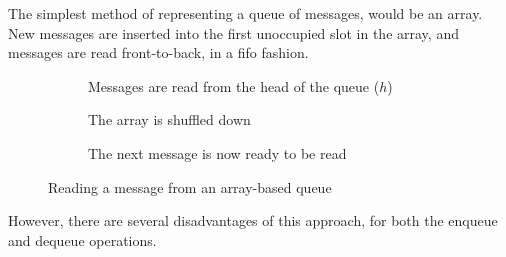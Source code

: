 The simplest method of representing a queue of messages, would be an array. New
messages are inserted into the first unoccupied slot in the array, and messages
are read front-to-back, in a \gls{fifo} fashion.

\begin{figure}[H]
  \centering
  \begin{subfigure}[b]{\textwidth}
    \centering
    
    \caption{Messages are read from the head of the queue ($h$)}
    \label{fig:tikz:queueArrayInitial}
  \end{subfigure}

  \begin{subfigure}[b]{\textwidth}
    \centering
    
    \caption{The array is shuffled down}
    \label{fig:tikz:queueArrayHeadRead}
  \end{subfigure}

  \begin{subfigure}[b]{\textwidth}
    \centering
    
    \caption{The next message is now ready to be read}
    \label{fig:tikz:queueArrayPostShuffle}
  \end{subfigure}
  \caption{Reading a message from an array-based queue}
  \label{fig:tikz:queueArray}
\end{figure}

However, there are several disadvantages of this approach, for both the enqueue and dequeue operations.


